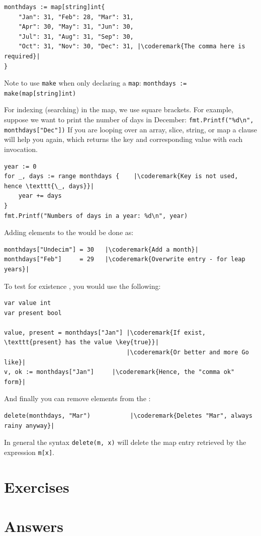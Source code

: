 \begin{lstlisting}
monthdays := map[string]int{
	"Jan": 31, "Feb": 28, "Mar": 31, 
	"Apr": 30, "May": 31, "Jun": 30, 
	"Jul": 31, "Aug": 31, "Sep": 30, 
	"Oct": 31, "Nov": 30, "Dec": 31, |\coderemark{The comma here is required}|
}		    
\end{lstlisting}
Note to use \lstinline{make} when only declaring a \lstinline{map}:
\lstinline|monthdays := make(map[string]int)|

For indexing (searching) in the map, we use square brackets. For example,
suppose we want to print the
number of days in December: \lstinline{fmt.Printf("%d\n", monthdays["Dec"])}\newline
If you are looping over an array, slice, string, or map a
clause will help you again, which returns the key and corresponding value
with each invocation.
\begin{lstlisting}
year := 0
for _, days := range monthdays {    |\coderemark{Key is not used, hence \texttt{\_, days}}|
    year += days
}
fmt.Printf("Numbers of days in a year: %d\n", year)
\end{lstlisting}
Adding elements to the   would be done as:
\begin{lstlisting}
monthdays["Undecim"] = 30	|\coderemark{Add a month}|
monthdays["Feb"]     = 29	|\coderemark{Overwrite entry - for leap years}|
\end{lstlisting}
To test for existence , you would use the
following\cite{go_course_day2}:
\begin{lstlisting}
var value int
var present bool

value, present = monthdays["Jan"] |\coderemark{If exist, \texttt{present} has the value \key{true}}|
                                  |\coderemark{Or better and more Go like}|
v, ok := monthdays["Jan"]	  |\coderemark{Hence, the "comma ok" form}|
\end{lstlisting}
And finally you can remove elements  from the :
\begin{lstlisting}
delete(monthdays, "Mar")           |\coderemark{Deletes "Mar", always rainy anyway}|
\end{lstlisting}
In general the syntax \lstinline{delete(m, x)} will delete the map entry
retrieved by the expression \lstinline{m[x]}.

\section{Exercises}








\cleardoublepage
\section{Answers}
\shipoutAnswer
